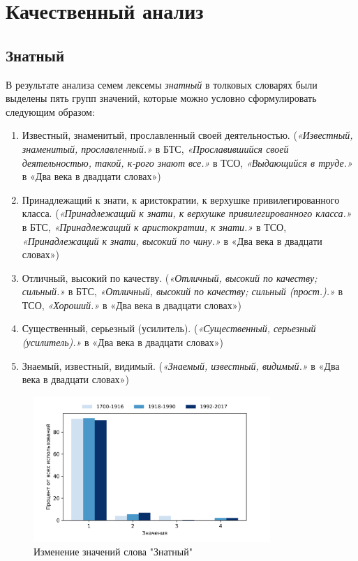 \chapter{Качественный анализ}

\section*{Знатный}

В результате анализа семем лексемы \textit{знатный} в толковых словарях были выделены пять групп значений,
которые можно условно сформулировать следующим образом:

\begin{enumerate}
    \item Известный, знаменитый, прославленный своей деятельностью.
    (\textit{«Известный, знаменитый, прославленный.»} в БТС,
    \textit{«Прославившийся своей деятельностью, такой, к-рого знают все.»} в ТСО,
    \textit{«Выдающийся в труде.»} в «Два века в двадцати словах»)

    \item Принадлежащий к знати, к аристократии, к верхушке привилегированного класса.
    (\textit{«Принадлежащий к знати, к верхушке привилегированного класса.»} в БТС,
    \textit{«Принадлежащий к аристократии, к знати.»} в ТСО,
    \textit{«Принадлежащий к знати, высокий по чину.»} в «Два века в двадцати словах»)

    \item Отличный, высокий по качеству.
    (\textit{«Отличный, высокий по качеству; сильный.»} в БТС,
    \textit{«Отличный, высокий по качеству; сильный (прост.).»} в ТСО,
    \textit{«Хороший.»} в «Два века в двадцати словах»)

    \item Существенный, серьезный (усилитель).
    (\textit{«Существенный, серьезный (усилитель).»} в «Два века в двадцати словах»)

    \item Знаемый, известный, видимый.
    (\textit{«Знаемый, известный, видимый.»} в «Два века в двадцати словах»)
\end{enumerate}

\begin{figure}[H]
	\centering
	\includegraphics[width=0.8\textwidth]{img/visualizations/znatnyj_minimal}
	\caption{Изменение значений слова "Знатный"}
	\label{fig:Знатный}
\end{figure}

